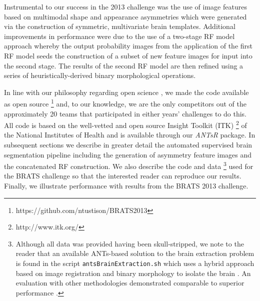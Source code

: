 \documentclass[preprint,authoryear,review,12pt]{elsarticle}
\begin{document}


Instrumental to our success in the 2013 challenge 
was the use of image features based on multimodal shape and appearance 
asymmetries which were generated via the construction of symmetric, 
multivariate brain templates.  Additional improvements in performance
were due to the use of a two-stage RF model approach
whereby the output probability images from the application of the first
RF model seeds the construction of a subset of new feature images
for input into the second stage.  The results of the second RF model
are then refined using a series of heuristically-derived binary morphological
operations.

In line with our philosophy regarding open science \citep{tustison2013,ince2012}, 
we made the code available as open source%
\footnote{
https://github.com/ntustison/BRATS2013
}
and, to our knowledge, we are the only competitors out of the approximately 20 teams 
that participated in either years' challenges to do this.  All code is based
on the well-vetted and open source Insight Toolkit (ITK)%
\footnote{
http://www.itk.org/
} 
of the National Institutes of Health and is available through our \textit{ANTsR} 
package.
In subsequent sections we describe in greater detail the automated 
supervised brain segmentation pipeline including the generation of asymmetry
feature images and the concatenated RF construction.  We also
describe the code and data%
\footnote{
Although all data was provided having been skull-stripped, 
we note to the reader that an
available ANTs-based solution to the brain extraction problem
is found in the script {\tt antsBrainExtraction.sh} which uses
a hybrid approach based on image registration and binary morphology
to isolate the brain \citep{avants2010a}.  An evaluation with other
methodologies demonstrated comparable to superior performance 
\citep{avants2010a}.
} 
used for the BRATS challenge so that 
the interested reader can reproduce our results.  Finally, we 
illustrate performance with results from the BRATS 2013 challenge.
\end{document}
